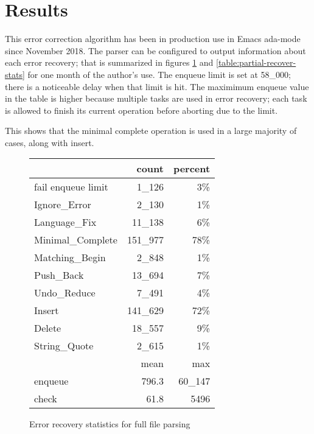 \documentclass[authordraft]{acmart}
\begin{document}
\section{Results}
\label{sect:result}
This error correction algorithm has been in production use in Emacs
ada-mode since November 2018. The parser can be configured to output
information about each error recovery; that is summarized in figures
\ref{table:full-recover-stats} and \ref{table:partial-recover-stats} for
one month of the author's use. The enqueue limit is set at 58\_000;
there is a noticeable delay when that limit is hit. The maximimum
enqueue value in the table is higher because multiple tasks are used
in error recovery; each task is allowed to finish its current
operation before aborting due to the limit.

This shows that the minimal complete operation is used in a large
majority of cases, along with insert.

\begin{figure}[H]
\caption{Error recovery statistics for full file parsing}
\begin{tabular}{l r r}
\toprule
                   & count    & percent \\
\midrule
fail enqueue limit & 1\_126   & 3\%     \\
Ignore\_Error      & 2\_130   & 1\%     \\
Language\_Fix      & 11\_138  & 6\%     \\
Minimal\_Complete  & 151\_977 & 78\%    \\
Matching\_Begin    & 2\_848   & 1\%     \\
Push\_Back         & 13\_694  & 7\%     \\
Undo\_Reduce       & 7\_491   & 4\%     \\
Insert             & 141\_629 & 72\%    \\
Delete             & 18\_557  & 9\%     \\
String\_Quote      & 2\_615   & 1\%     \\
\bottomrule
                   & mean     & max     \\
\midrule
enqueue            & 796.3    & 60\_147 \\
check              & 61.8     & 5496    \\
\bottomrule
\end{tabular}
\label{table:full-recover-stats}
\end{figure}
\end{document}
